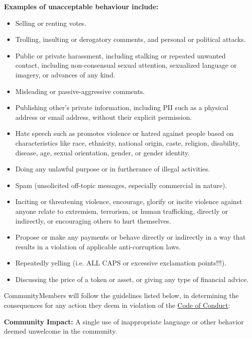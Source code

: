 \textbf{Examples of unacceptable behaviour include:}
\begin{itemize}
	\item Selling or renting votes.
	\item Trolling, insulting or derogatory comments, and personal or political attacks.
	\item Public or private harassment, including stalking or repeated unwanted contact, including non-consensual sexual attention, sexualized language or imagery, or advances of any kind.
	\item Misleading or passive-aggressive comments.
	\item Publishing other's private information, including \ac{PII} such as a physical address or email address, without their explicit permission.
	\item Hate speech such as promotes violence or hatred against people based on characteristics like race, ethnicity, national origin, caste, religion, disability, disease, age, sexual orientation, gender, or gender identity.
	\item Doing any unlawful purpose or in furtherance of illegal activities.
	\item Spam (unsolicited off-topic messages, especially commercial in nature).
	\item Inciting or threatening violence, encourage, glorify or incite violence against anyone relate to extremism, terrorism, or human trafficking, directly or indirectly, or encouraging others to hurt themselves.
	\item Propose or make any payments or behave directly or indirectly in a way that results in a violation of applicable anti-corruption laws.
	\item Repeatedly yelling (i.e. ALL CAPS or excessive exclamation points!!!).
	\item Discussing the price of a token or asset, or giving any type of financial advice.
\end{itemize}


\glspl{CommunityMember} will follow the guidelines listed below, in determining the consequences for any action they deem in violation of the \hyperref[sec:CodeOfConduct]{Code of Conduct}:

\textbf{Community Impact:} A single use of inappropriate language or other behavior deemed unwelcome in the community.

